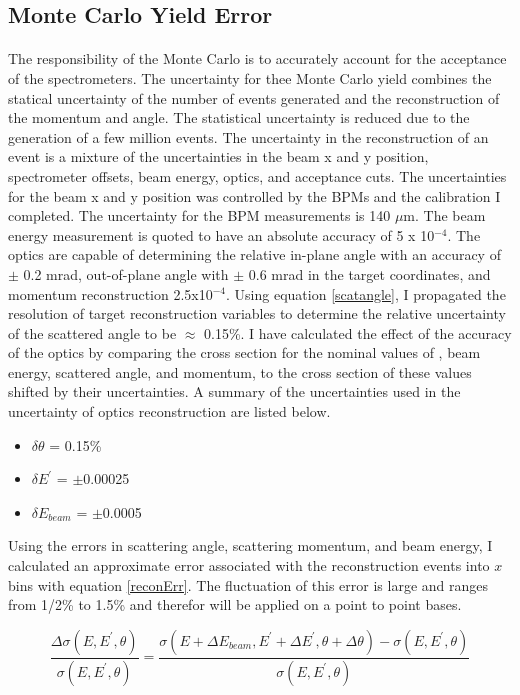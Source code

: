 \subsection{Monte Carlo Yield Error}
\paragraph{}The responsibility of the Monte Carlo is to accurately account for the acceptance of the spectrometers. The uncertainty for thee Monte Carlo yield combines the statical uncertainty of the number of events generated and the reconstruction of the momentum and angle.  The statistical uncertainty is reduced due to the generation of a few million events. The uncertainty in the reconstruction of an event is a mixture of the uncertainties in the beam x and y position, spectrometer offsets, beam energy, optics, and acceptance cuts. The uncertainties for the beam x and y position was controlled by the BPMs and the calibration I completed. The uncertainty for the BPM measurements is 140 $\mu$m. The beam energy measurement is quoted to have an absolute accuracy of 5 x 10$^{-4}$.  The optics are capable of determining the relative in-plane angle with an accuracy of $\pm$ 0.2 mrad, out-of-plane angle with $\pm$ 0.6 mrad in the target coordinates, and momentum reconstruction 2.5x10$^{-4}$\cite{HallA}.  Using equation \ref{scatangle}, I propagated the resolution of target reconstruction variables to determine the relative uncertainty of the scattered angle to be $\approx$ 0.15\%. I have calculated the effect of the accuracy of the optics by comparing the cross section for the nominal values of , beam energy, scattered angle, and momentum, to the cross section of these values shifted by their uncertainties. A summary of the uncertainties used in the uncertainty of optics reconstruction are listed below.
\begin{itemize}
\item$\delta \theta$ = 0.15\%
\item$\delta E^{\prime}$ = $\pm$0.00025
\item$\delta E_{beam}$ = $\pm$0.0005
\end{itemize}
Using the errors in scattering angle, scattering momentum, and beam energy, I calculated an approximate error associated with the reconstruction events into $x$ bins with equation \ref{reconErr}. The fluctuation of this error is large and ranges from 1/2\% to 1.5\% and therefor will be applied on a point to point bases. 

\begin{equation}
\frac{\Delta \sigma(E,E^{\prime},\theta)}{ \sigma(E,E^{\prime},\theta)} = \frac{\sigma(E+\Delta E_{beam},E^{\prime}+\Delta E^{\prime},\theta+\Delta \theta) - \sigma(E,E^{\prime},\theta)}{\sigma(E,E^{\prime},\theta)} \label{reconErr}
\end{equation}

